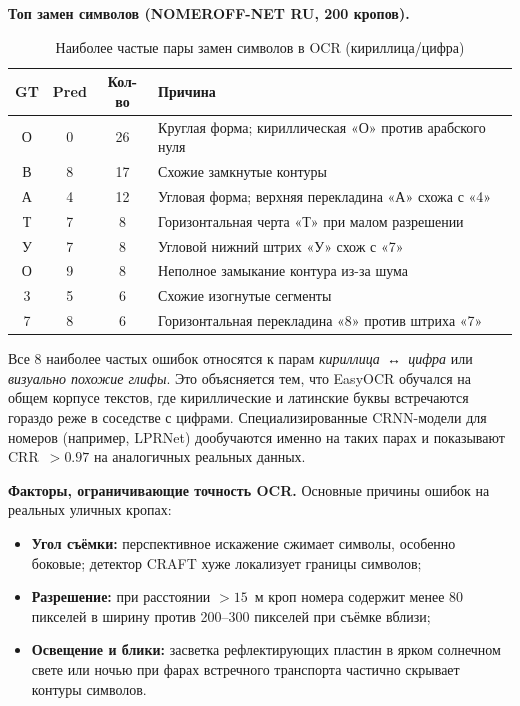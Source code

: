 \documentclass[10pt,a4paper]{report}
\numberwithin{equation}{chapter}
\numberwithin{figure}{chapter}
\numberwithin{table}{chapter}
\begin{document}
\textbf{Топ замен символов (NOMEROFF-NET RU, 200 кропов).}

\begin{table}[H]
\centering
\caption{Наиболее частые пары замен символов в OCR (кириллица/цифра)}
\label{tab:ocr_confusions}
\begin{tabular}{ccc p{7cm}}
\toprule
\textbf{GT} & \textbf{Pred} & \textbf{Кол-во} & \textbf{Причина} \\
\midrule
О & 0 & 26 & Круглая форма; кириллическая «О» против арабского нуля \\
В & 8 & 17 & Схожие замкнутые контуры \\
А & 4 & 12 & Угловая форма; верхняя перекладина «А» схожа с «4» \\
Т & 7 & 8  & Горизонтальная черта «Т» при малом разрешении \\
У & 7 & 8  & Угловой нижний штрих «У» схож с «7» \\
О & 9 & 8  & Неполное замыкание контура из-за шума \\
3 & 5 & 6  & Схожие изогнутые сегменты \\
7 & 8 & 6  & Горизонтальная перекладина «8» против штриха «7» \\
\bottomrule
\end{tabular}
\end{table}

Все 8 наиболее частых ошибок относятся к парам \emph{кириллица~↔~цифра}
или \emph{визуально похожие глифы}.
Это объясняется тем, что EasyOCR обучался на общем корпусе текстов,
где кириллические и латинские буквы встречаются гораздо реже
в соседстве с цифрами. Специализированные CRNN-модели для номеров
(например, LPRNet) дообучаются именно на таких парах и показывают
CRR~$>0.97$ на аналогичных реальных данных.

\textbf{Факторы, ограничивающие точность OCR.}
Основные причины ошибок на реальных уличных кропах:
\begin{itemize}[nosep]
  \item \textbf{Угол съёмки:} перспективное искажение сжимает символы,
    особенно боковые; детектор CRAFT хуже локализует границы символов;
  \item \textbf{Разрешение:} при расстоянии $>15$~м кроп номера
    содержит менее 80 пикселей в ширину против 200--300 пикселей
    при съёмке вблизи;
  \item \textbf{Освещение и блики:} засветка рефлектирующих пластин
    в ярком солнечном свете или ночью при фарах встречного транспорта
    частично скрывает контуры символов.
\end{itemize}
\end{document}
